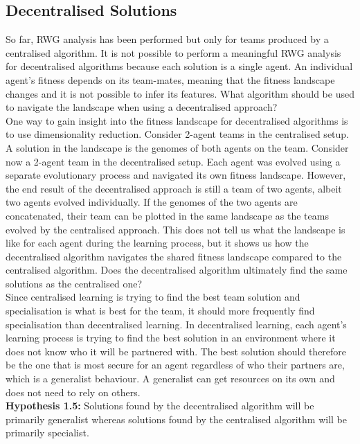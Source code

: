 \documentclass[12pt]{article}
\begin{document}
\subsection{Decentralised Solutions} 

So far, RWG analysis has been performed but only for teams produced by a centralised algorithm.
It is not possible to perform a meaningful RWG analysis for decentralised algorithms because each solution is a single agent.
An individual agent's fitness depends on its team-mates, meaning that the fitness landscape changes and it is not possible to infer its features.
What algorithm should be used to navigate the landscape when using a decentralised approach?\\

One way to gain insight into the fitness landscape for decentralised algorithms is to use dimensionality reduction.
Consider 2-agent teams in the centralised setup.
A solution in the landscape is the genomes of both agents on the team.
Consider now a 2-agent team in the decentralised setup.
Each agent was evolved using a separate evolutionary process and navigated its own fitness landscape.
However, the end result of the decentralised approach is still a team of two agents, albeit two agents evolved individually.
If the genomes of the two agents are concatenated, their team can be plotted in the same landscape as the teams evolved by the centralised approach.
This does not tell us what the landscape is like for each agent during the learning process, but it shows us how the decentralised algorithm navigates the shared fitness landscape compared to the centralised algorithm.
Does the decentralised algorithm ultimately find the same solutions as the centralised one?\\

Since centralised learning is trying to find the best team solution and specialisation is what is best for the team, it should more frequently find specialisation than decentralised learning. 
In decentralised learning, each agent's learning process is trying to find the best solution in an environment where it does not know who it will be partnered with. 
The best solution should therefore be the one that is most secure for an agent regardless of who their partners are, which is a generalist behaviour.
A generalist can get resources on its own and does not need to rely on others.\\

\textbf{Hypothesis 1.5:} Solutions found by the decentralised algorithm will be primarily generalist whereas solutions found by the centralised algorithm will be primarily specialist.\\
\end{document}
